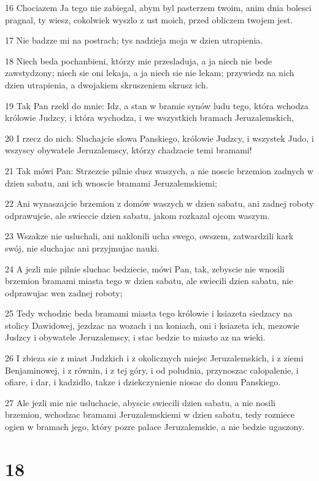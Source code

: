 \par 16 Chociazem Ja tego nie zabiegal, abym byl pasterzem twoim, anim dnia bolesci pragnal, ty wiesz, cokolwiek wyszlo z ust moich, przed obliczem twojem jest.
\par 17 Nie badzze mi na postrach; tys nadzieja moja w dzien utrapienia.
\par 18 Niech beda pochanbieni, którzy mie przesladuja, a ja niech nie bede zawstydzony; niech sie oni lekaja, a ja niech sie nie lekam; przywiedz na nich dzien utrapienia, a dwojakiem skruszeniem skrusz ich.
\par 19 Tak Pan rzekl do mnie: Idz, a stan w bramie synów ludu tego, która wchodza królowie Judzcy, i która wychodza, i we wszystkich bramach Jeruzalemskich,
\par 20 I rzecz do nich: Sluchajcie slowa Panskiego, królowie Judzcy, i wszystek Judo, i wszyscy obywatele Jeruzalemscy, którzy chadzacie temi bramami!
\par 21 Tak mówi Pan: Strzezcie pilnie dusz waszych, a nie noscie brzemion zadnych w dzien sabatu, ani ich wnoscie bramami Jeruzalemskiemi;
\par 22 Ani wynaszajcie brzemion z domów waszych w dzien sabatu, ani zadnej roboty odprawujcie, ale swieccie dzien sabatu, jakom rozkazal ojcom waszym.
\par 23 Wszakze nie usluchali, ani naklonili ucha swego, owszem, zatwardzili kark swój, nie sluchajac ani przyjmujac nauki.
\par 24 A jezli mie pilnie sluchac bedziecie, mówi Pan, tak, zebyscie nie wnosili brzemion bramami miasta tego w dzien sabatu, ale swiecili dzien sabatu, nie odprawujac wen zadnej roboty;
\par 25 Tedy wchodzic beda bramami miasta tego królowie i ksiazeta siedzacy na stolicy Dawidowej, jezdzac na wozach i na koniach, oni i ksiazeta ich, mezowie Judzcy i obywatele Jeruzalemscy, i stac bedzie to miasto az na wieki.
\par 26 I zbieza sie z miast Judzkich i z okolicznych miejsc Jeruzalemskich, i z ziemi Benjaminowej, i z równin, i z tej góry, i od poludnia, przynoszac calopalenie, i ofiare, i dar, i kadzidlo, takze i dziekczynienie niosac do domu Panskiego.
\par 27 Ale jezli mie nie usluchacie, abyscie swiecili dzien sabatu, a nie nosili brzemion, wchodzac bramami Jeruzalemskiemi w dzien sabatu, tedy rozniece ogien w bramach jego, który pozre palace Jeruzalemskie, a nie bedzie ugaszony.

\chapter{18}


